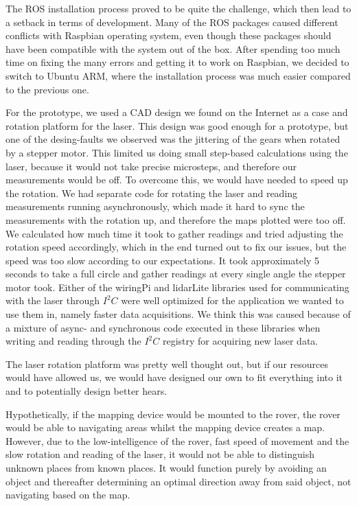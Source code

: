 The ROS installation process proved to be quite the challenge, which then lead to a setback in terms of development. Many of the ROS packages caused different conflicts with Raspbian operating system, even though these packages should have been compatible with the system out of the box. After spending too much time on fixing the many errors and getting it to work on Raspbian, we decided to switch to Ubuntu ARM, where the installation process was much easier compared to the previous one.

For the prototype, we used a CAD design we found on the Internet as a case and rotation platform for the laser. This design was good enough for a prototype, but one of the desing-faults we observed was the jittering of the gears when rotated by a stepper motor. This limited us doing small step-based calculations using the laser, because it would not take precise microsteps, and therefore our measurements would be off. To overcome this, we would have needed to speed up the rotation. We had separate code for rotating the laser and reading measurements running asynchronously, which made it hard to sync the measurements with the rotation up, and therefore the maps plotted were too off. We calculated how much time it took to gather readings and tried adjusting the rotation speed accordingly, which in the end turned out to fix our issues, but the speed was too slow according to our expectations. It took approximately 5 seconds to take a full circle and gather readings at every single angle the stepper motor took. 
Either of the wiringPi and lidarLite libraries used for communicating with the laser through $I^2C$ were well optimized for the application we wanted to use them in, namely faster data acquisitions. We think this was caused because of a mixture of async- and synchronous code executed in these libraries when writing and reading through the $I^2C$ registry for acquiring new laser data.

The laser rotation platform was pretty well thought out, but if our resources would have allowed us, we would have designed our own to fit everything into it and to potentially design better hears.

Hypothetically, if the mapping device would be mounted to the rover, the rover would be able to navigating areas whilst the mapping device creates a map. However, due to the low-intelligence of the rover, fast speed of movement and the slow rotation and reading of the laser, it would not be able to distinguish unknown places from known places. It would function purely by avoiding an object and thereafter determining an optimal direction away from said object, not navigating based on the map. 

